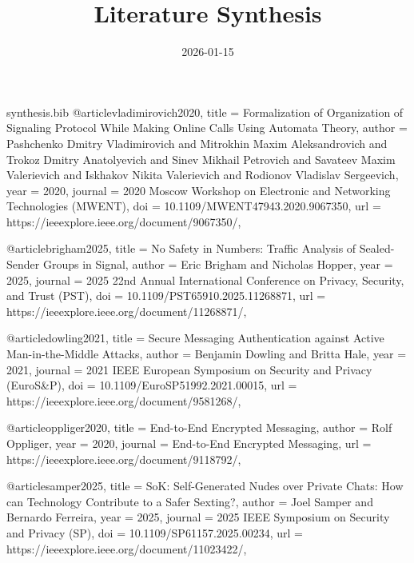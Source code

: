 \begin{filecontents*}{synthesis.bib}
@article{vladimirovich2020,
  title = {Formalization of Organization of Signaling Protocol While Making Online Calls Using Automata Theory},
  author = {Pashchenko Dmitry Vladimirovich and Mitrokhin Maxim Aleksandrovich and Trokoz Dmitry Anatolyevich and Sinev Mikhail Petrovich and Savateev Maxim Valerievich and Iskhakov Nikita Valerievich and Rodionov Vladislav Sergeevich},
  year = {2020},
  journal = {2020 Moscow Workshop on Electronic and Networking Technologies (MWENT)},
  doi = {10.1109/MWENT47943.2020.9067350},
  url = {https://ieeexplore.ieee.org/document/9067350/},
}

@article{brigham2025,
  title = {No Safety in Numbers: Traffic Analysis of Sealed-Sender Groups in Signal},
  author = {Eric Brigham and Nicholas Hopper},
  year = {2025},
  journal = {2025 22nd Annual International Conference on Privacy, Security, and Trust (PST)},
  doi = {10.1109/PST65910.2025.11268871},
  url = {https://ieeexplore.ieee.org/document/11268871/},
}

@article{dowling2021,
  title = {Secure Messaging Authentication against Active Man-in-the-Middle Attacks},
  author = {Benjamin Dowling and Britta Hale},
  year = {2021},
  journal = {2021 IEEE European Symposium on Security and Privacy (EuroS\&P)},
  doi = {10.1109/EuroSP51992.2021.00015},
  url = {https://ieeexplore.ieee.org/document/9581268/},
}

@article{oppliger2020,
  title = {End-to-End Encrypted Messaging},
  author = {Rolf Oppliger},
  year = {2020},
  journal = {End-to-End Encrypted Messaging},
  url = {https://ieeexplore.ieee.org/document/9118792/},
}

@article{samper2025,
  title = {SoK: Self-Generated Nudes over Private Chats: How can Technology Contribute to a Safer Sexting?},
  author = {Joel Samper and Bernardo Ferreira},
  year = {2025},
  journal = {2025 IEEE Symposium on Security and Privacy (SP)},
  doi = {10.1109/SP61157.2025.00234},
  url = {https://ieeexplore.ieee.org/document/11023422/},
}
\end{filecontents*}

\documentclass{article}
\usepackage[utf8]{inputenc}
\usepackage{hyperref}
\usepackage{enumitem}
\usepackage{longtable}
\usepackage{booktabs}
\usepackage{array}
\usepackage[backend=biber,style=authoryear]{biblatex}


\title{Literature Synthesis}
\date{2026-01-15}


\maketitle

